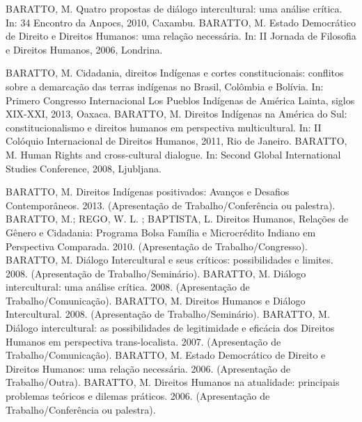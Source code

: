 \begin{cvcitems}
  \cvcitem
    {BARATTO, M.}
    {Quatro propostas de diálogo intercultural: uma análise crítica. In: 34 Encontro da Anpocs, 2010, Caxambu.}
  \cvcitem
    {BARATTO, M.}
  {Estado Democrático de Direito e Direitos Humanos: uma relação necessária. In: II Jornada de Filosofia e Direitos Humanos, 2006, Londrina.}
\end{cvcitems}


\begin{cvcitems}
  \cvcitem
    {BARATTO, M.}
    {Cidadania, direitos Indígenas e cortes constitucionais: conflitos sobre a demarcação das terras indígenas no Brasil, Colômbia e Bolívia. In: Primero Congresso Internacional Los Pueblos Indígenas de América Lainta, siglos XIX-XXI, 2013, Oaxaca.}
  \cvcitem
    {BARATTO, M.}
    {Direitos Indígenas na América do Sul: constitucionalismo e direitos humanos em perspectiva multicultural. In: II Colóquio Internacional de Direitos Humanos, 2011, Rio de Janeiro.}
  \cvcitem
    {BARATTO, M.}
    {Human Rights and cross-cultural dialogue. In: Second Global International Studies Conference, 2008, Ljubljana.}
\end{cvcitems}


\begin{cvcitems}
  \cvcitem
    {BARATTO, M.}
    {Direitos Indígenas positivados: Avanços e Desafios Contemporâneos. 2013. (Apresentação de Trabalho/Conferência ou palestra).}
  \cvcitem
    {BARATTO, M.; REGO, W. L. ; BAPTISTA, L.}
    {Direitos Humanos, Relações de Gênero e Cidadania: Programa Bolsa Família e Microcrédito Indiano em Perspectiva Comparada. 2010. (Apresentação de Trabalho/Congresso).}
  \cvcitem
    {BARATTO, M.}
    {Diálogo Intercultural e seus críticos: possibilidades e limites. 2008. (Apresentação de Trabalho/Seminário).}
  \cvcitem
    {BARATTO, M.}
    {Diálogo intercultural: uma análise crítica. 2008. (Apresentação de Trabalho/Comunicação).}
  \cvcitem
    {BARATTO, M.}
    {Direitos Humanos e Diálogo Intercultural. 2008. (Apresentação de Trabalho/Seminário).}
  \cvcitem
    {BARATTO, M.}
    {Diálogo intercultural: as possibilidades de legitimidade e eficácia dos Direitos Humanos em perspectiva trans-localista. 2007. (Apresentação de Trabalho/Comunicação).}
  \cvcitem
    {BARATTO, M.}
    {Estado Democrático de Direito e Direitos Humanos: uma relação necessária. 2006. (Apresentação de Trabalho/Outra).}
  \cvcitem
    {BARATTO, M.}
    {Direitos Humanos na atualidade: principais problemas teóricos e dilemas práticos. 2006. (Apresentação de Trabalho/Conferência ou palestra).}
\end{cvcitems}

